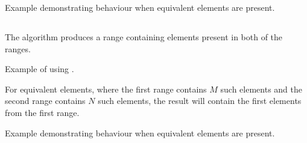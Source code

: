 \begin{codebox}[]{\href{https://compiler-explorer.com/z/KbqGWbzP6}{\ExternalLink}}
\footnotesize Example demonstrating  behaviour when equivalent elements are present.
\tcblower
{}
\end{codebox}

\subsection{\texorpdfstring{}{\texttt{std::set\_intersection}}}

The  algorithm produces a range containing elements present in both of the ranges.


\begin{codebox}[]{\href{https://compiler-explorer.com/z/h3fqn9K6v}{\ExternalLink}}
    \footnotesize Example of using .
    \tcblower
\end{codebox}

For equivalent elements, where the first range contains $M$ such elements and the second range contains $N$ such elements, the result will contain the first  elements from the first range.

\begin{codebox}[]{\href{https://compiler-explorer.com/z/seK3YWqTo}{\ExternalLink}}
\footnotesize Example demonstrating  behaviour when equivalent elements are present.
\tcblower
{}
\end{codebox}